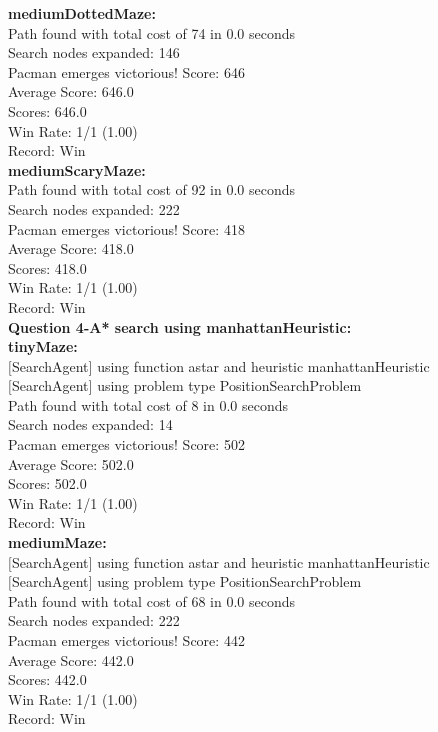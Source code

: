 \documentclass[11pt]{article}
\begin{document}
\noindent
\textbf{mediumDottedMaze:}\\
Path found with total cost of 74 in 0.0 seconds\\
Search nodes expanded: 146\\
Pacman emerges victorious! Score: 646\\
Average Score: 646.0\\
Scores:        646.0\\
Win Rate:      1/1 (1.00)\\
Record:        Win\\

\noindent
\textbf{mediumScaryMaze:}\\
Path found with total cost of 92 in 0.0 seconds\\
Search nodes expanded: 222\\
Pacman emerges victorious! Score: 418\\
Average Score: 418.0\\
Scores:        418.0\\
Win Rate:      1/1 (1.00)\\
Record:        Win\\


\newpage
\noindent
\textbf{Question 4-A* search using manhattanHeuristic:}\\
\textbf{tinyMaze:}\\
$[$SearchAgent$]$ using function astar and heuristic manhattanHeuristic\\
$[$SearchAgent$]$ using problem type PositionSearchProblem\\
Path found with total cost of 8 in 0.0 seconds\\
Search nodes expanded: 14\\
Pacman emerges victorious! Score: 502\\
Average Score: 502.0\\
Scores:        502.0\\
Win Rate:      1/1 (1.00)\\
Record:        Win\\

\noindent
\textbf{mediumMaze:}\\
$[$SearchAgent$]$ using function astar and heuristic manhattanHeuristic\\
$[$SearchAgent$]$ using problem type PositionSearchProblem\\
Path found with total cost of 68 in 0.0 seconds\\
Search nodes expanded: 222\\
Pacman emerges victorious! Score: 442\\
Average Score: 442.0\\
Scores:        442.0\\
Win Rate:      1/1 (1.00)\\
Record:        Win\\
\end{document}
